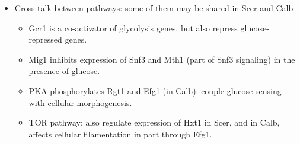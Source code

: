 \documentclass{report}
\begin{document}
\begin{itemize}
\item Cross-talk between pathways: some of them may be shared in Scer and Calb
\begin{itemize}
	\item Gcr1 is a co-activator of glycolysis genes, but also repress glucose-repressed genes. 
	\item Mig1 inhibits expression of Snf3 and Mth1 (part of Snf3 signaling) in the presence of glucose. 
	\item PKA phosphorylates Rgt1 and Efg1 (in Calb): couple glucose sensing with cellular morphogenesis. 
	\item TOR pathway: also regulate expression of Hxt1 in Scer, and in Calb, affects cellular filamentation in part through Efg1. 
\end{itemize}
\end{itemize}
\end{document}
